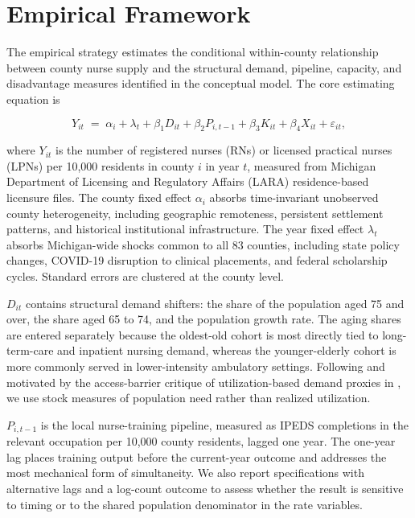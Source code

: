 \documentclass[12pt]{article}
\begin{document}
\section{Empirical Framework}\label{sec:empirical}

The empirical strategy estimates the conditional within-county
  relationship between county nurse supply and the structural demand,
  pipeline, capacity, and disadvantage measures identified in the
  conceptual model. The core estimating equation is

  \begin{equation}
      Y_{it} \;=\; \alpha_i + \lambda_t
      + \beta_{1} D_{it} + \beta_{2} P_{i,t-1}
      + \beta_{3} K_{it}  + \beta_{4} X_{it}
      + \varepsilon_{it},
      \label{eq:main}
  \end{equation}

  where $Y_{it}$ is the number of registered nurses (RNs) or licensed
  practical nurses (LPNs) per 10{,}000 residents in county $i$ in year
  $t$, measured from Michigan Department of Licensing and Regulatory
  Affairs (LARA) residence-based licensure files. The county fixed effect
  $\alpha_i$ absorbs time-invariant unobserved county heterogeneity,
  including geographic remoteness, persistent settlement patterns, and
  historical institutional infrastructure. The year fixed effect
  $\lambda_t$ absorbs Michigan-wide shocks common to all 83 counties,
  including state policy changes, COVID-19 disruption to clinical
  placements, and federal scholarship cycles. Standard errors are
  clustered at the county level.

  $D_{it}$ contains structural demand shifters: the share of the
  population aged 75 and over, the share aged 65 to 74, and the
  population growth rate. The aging shares are entered separately because
  the oldest-old cohort is most directly tied to long-term-care and
  inpatient nursing demand, whereas the younger-elderly cohort is more
  commonly served in lower-intensity ambulatory settings. Following
  \citet{andersen1995} and motivated by the access-barrier critique of
  utilization-based demand proxies in \citet{reilly2021}, we use stock
  measures of population need rather than realized utilization.

  $P_{i,t-1}$ is the local nurse-training pipeline, measured as IPEDS
  completions in the relevant occupation per 10{,}000 county residents,
  lagged one year. The one-year lag places training output before the
  current-year outcome and addresses the most mechanical form of
  simultaneity. We also report specifications with alternative lags and a
  log-count outcome to assess whether the result is sensitive to timing or
  to the shared population denominator in the rate variables.
\end{document}
